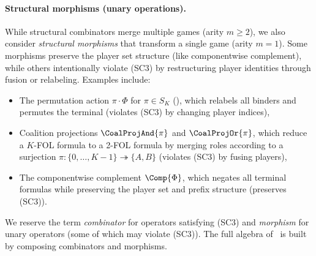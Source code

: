 \paragraph{Structural morphisms (unary operations).}
While structural combinators merge multiple games (arity $m \geq 2$), we also 
consider \emph{structural morphisms} that transform a single game (arity $m=1$). 
Some morphisms preserve the player set structure (like componentwise complement), 
while others intentionally violate (SC3) by restructuring player identities through 
fusion or relabeling. Examples include:
\begin{itemize}[nosep]
  \item The permutation action $\pi \cdot \Phi$ for $\pi \in S_K$ 
    (), which relabels all binders and permutes the terminal 
    (violates (SC3) by changing player indices),
  \item Coalition projections $\CoalProjAnd{\pi}$ and $\CoalProjOr{\pi}$, which 
    reduce a $K$-FOL formula to a 2-FOL formula by merging roles according to 
    a surjection $\pi: \{0,\ldots,K-1\} \twoheadrightarrow \{A, B\}$ 
    (violates (SC3) by fusing players),
  \item The componentwise complement $\Comp{\Phi}$, which negates all terminal 
    formulas while preserving the player set and prefix structure (preserves (SC3)).
\end{itemize}
We reserve the term \emph{combinator} for operators satisfying (SC3) and 
\emph{morphism} for unary operators (some of which may violate (SC3)). 
The full algebra of \KFOL\ is built by composing combinators and morphisms.


